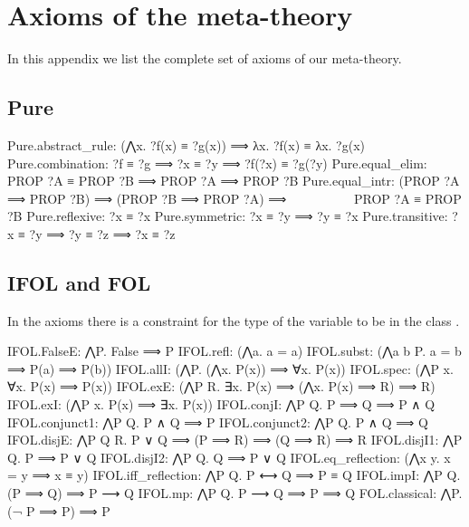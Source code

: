 \section{Axioms of the meta-theory}
\label{appendix:axioms}

In this appendix we list the complete set of axioms of our meta-theory.

\subsection{Pure}
\begin{isabelle}
Pure.abstract\_rule: (⋀x. ?f(x) ≡ ?g(x)) ⟹ λx. ?f(x) ≡ λx. ?g(x)\isanewline
Pure.combination: ?f ≡ ?g ⟹ ?x ≡ ?y ⟹ ?f(?x) ≡ ?g(?y)\isanewline
Pure.equal\_elim: PROP ?A ≡ PROP ?B ⟹ PROP ?A ⟹ PROP ?B\isanewline
Pure.equal\_intr: (PROP ?A ⟹ PROP ?B) ⟹ (PROP ?B ⟹ PROP ?A) ⟹ \isanewline
\ \ \ \ \ \ \ \ \ \ PROP ?A ≡ PROP ?B\isanewline
Pure.reflexive: ?x ≡ ?x\isanewline
Pure.symmetric: ?x ≡ ?y ⟹ ?y ≡ ?x\isanewline
Pure.transitive: ?x ≡ ?y ⟹ ?y ≡ ?z ⟹ ?x ≡ ?z
\end{isabelle}

\subsection{IFOL and FOL}
In the axioms  there is a constraint
for the type of the variable  to be in the class .
\begin{isabelle}
IFOL.FalseE: ⋀P. False ⟹ P\isanewline
IFOL.refl:  (⋀a. a = a)\isanewline
IFOL.subst: (⋀a b P. a = b ⟹ P(a) ⟹ P(b))\isanewline
IFOL.allI:  (⋀P. (⋀x. P(x)) ⟹ ∀x. P(x))\isanewline
IFOL.spec:  (⋀P x. ∀x. P(x) ⟹ P(x))\isanewline
IFOL.exE:   (⋀P R. ∃x. P(x) ⟹ (⋀x. P(x) ⟹ R) ⟹ R)\isanewline
IFOL.exI:   (⋀P x. P(x) ⟹ ∃x. P(x))\isanewline
IFOL.conjI: ⋀P Q. P ⟹ Q ⟹ P ∧ Q\isanewline
IFOL.conjunct1: ⋀P Q. P ∧ Q ⟹ P\isanewline
IFOL.conjunct2: ⋀P Q. P ∧ Q ⟹ Q\isanewline
IFOL.disjE: ⋀P Q R. P ∨ Q ⟹ (P ⟹ R) ⟹ (Q ⟹ R) ⟹ R\isanewline
IFOL.disjI1: ⋀P Q. P ⟹ P ∨ Q\isanewline
IFOL.disjI2: ⋀P Q. Q ⟹ P ∨ Q\isanewline
IFOL.eq\_reflection: (⋀x y. x = y ⟹ x ≡ y)\isanewline
IFOL.iff\_reflection: ⋀P Q. P ⟷ Q ⟹ P ≡ Q\isanewline
IFOL.impI: ⋀P Q. (P ⟹ Q) ⟹ P ⟶ Q\isanewline
IFOL.mp: ⋀P Q. P ⟶ Q ⟹ P ⟹ Q\isanewline%
FOL.classical: ⋀P. (¬ P ⟹ P) ⟹ P
\end{isabelle}

